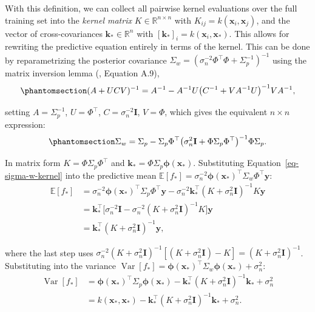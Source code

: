 \documentclass[
  letterpaper,
  DIV=11,
  numbers=noendperiod]{scrartcl}
\begin{document}
With this definition, we can collect all pairwise kernel evaluations
over the full training set into the \emph{kernel matrix}
\(K \in \mathbb{R}^{n \times n}\) with
\(K_{ij} = k(\mathbf{x}_i, \mathbf{x}_j)\), and the vector of
cross-covariances \(\mathbf{k}_* \in \mathbb{R}^n\) with
\([\mathbf{k}_*]_i = k(\mathbf{x}_i, \mathbf{x}_*)\). This allows for
rewriting the predictive equation entirely in terms of the kernel. This
can be done by reparametrizing the posterior covariance
\(\Sigma_w = (\sigma_n^{-2}\Phi^\top\Phi + \Sigma_p^{-1})^{-1}\) using
the matrix inversion lemma
(,
Equation A.9),
\begin{equation}\phantomsection\label{eq-matrix-inversion-lemma}{
(A + UCV)^{-1} = A^{-1} - A^{-1}U\bigl(C^{-1} + VA^{-1}U\bigr)^{-1}VA^{-1},
}\end{equation}

setting \(A = \Sigma_p^{-1}\), \(U = \Phi^\top\),
\(C = \sigma_n^{-2}\mathbf{I}\), \(V = \Phi\), which gives the
equivalent \(n \times n\) expression:
\begin{equation}\phantomsection\label{eq-sigma-w-kernel}{
\Sigma_w = \Sigma_p - \Sigma_p\Phi^\top\bigl(\sigma_n^2\mathbf{I} + \Phi\Sigma_p\Phi^\top\bigr)^{-1}\Phi\Sigma_p.
}\end{equation}

In matrix form \(K = \Phi\Sigma_p\Phi^\top\) and
\(\mathbf{k}_* = \Phi\Sigma_p\boldsymbol{\phi}(\mathbf{x}_*)\).
Substituting Equation~\ref{eq-sigma-w-kernel} into the predictive mean
\(\mathbb{E}[f_*] = \sigma_n^{-2}\boldsymbol{\phi}(\mathbf{x}_*)^\top\Sigma_w\Phi^\top\mathbf{y}\):
\[
\begin{aligned}
\mathbb{E}[f_*]
&= \sigma_n^{-2}\boldsymbol{\phi}(\mathbf{x}_*)^\top\Sigma_p\Phi^\top\mathbf{y} - \sigma_n^{-2}\mathbf{k}_*^\top(K + \sigma_n^2\mathbf{I})^{-1}K\mathbf{y} \\
&= \mathbf{k}_*^\top\bigl[\sigma_n^{-2}\mathbf{I} - \sigma_n^{-2}(K+\sigma_n^2\mathbf{I})^{-1}K\bigr]\mathbf{y} \\
&= \mathbf{k}_*^\top(K + \sigma_n^2\mathbf{I})^{-1}\mathbf{y},
\end{aligned}
\]

where the last step uses
\(\sigma_n^{-2}(K+\sigma_n^2\mathbf{I})^{-1}[(K+\sigma_n^2\mathbf{I})-K] = (K+\sigma_n^2\mathbf{I})^{-1}\).
Substituting into the variance
\(\operatorname{Var}[f_*] = \boldsymbol{\phi}(\mathbf{x}_*)^\top\Sigma_w\boldsymbol{\phi}(\mathbf{x}_*) + \sigma_n^2\):
\[
\begin{aligned}
\operatorname{Var}[f_*]
&= \boldsymbol{\phi}(\mathbf{x}_*)^\top\Sigma_p\boldsymbol{\phi}(\mathbf{x}_*) - \mathbf{k}_*^\top(K+\sigma_n^2\mathbf{I})^{-1}\mathbf{k}_* + \sigma_n^2 \\
&= k(\mathbf{x}_*, \mathbf{x}_*) - \mathbf{k}_*^\top(K + \sigma_n^2\mathbf{I})^{-1}\mathbf{k}_* + \sigma_n^2.
\end{aligned}
\]
\end{document}

